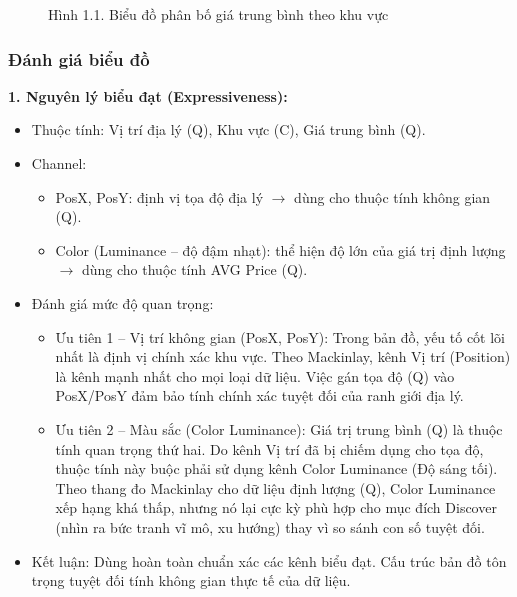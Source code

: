 \begin{figure}[H]
    \centering
    \caption{Hình 1.1. Biểu đồ phân bố giá trung bình theo khu vực}
    \label{fig:domain-task1-chart1}
\end{figure}

\subsubsection{Đánh giá biểu đồ}

\textbf{1. Nguyên lý biểu đạt (Expressiveness):}

\begin{itemize}
    \item Thuộc tính: Vị trí địa lý (Q), Khu vực (C), Giá trung bình (Q).
    \item Channel:
    \begin{itemize}
        \item PosX, PosY: định vị tọa độ địa lý $\rightarrow$ dùng cho thuộc tính không gian (Q).
        \item Color (Luminance -- độ đậm nhạt): thể hiện độ lớn của giá trị định lượng $\rightarrow$ dùng cho thuộc tính AVG Price (Q).
    \end{itemize}
    \item Đánh giá mức độ quan trọng:
    \begin{itemize}
        \item Ưu tiên 1 -- Vị trí không gian (PosX, PosY): Trong bản đồ, yếu tố cốt lõi nhất là định vị chính xác khu vực. Theo Mackinlay, kênh Vị trí (Position) là kênh mạnh nhất cho mọi loại dữ liệu. Việc gán tọa độ (Q) vào PosX/PosY đảm bảo tính chính xác tuyệt đối của ranh giới địa lý.
        \item Ưu tiên 2 -- Màu sắc (Color Luminance): Giá trị trung bình (Q) là thuộc tính quan trọng thứ hai. Do kênh Vị trí đã bị chiếm dụng cho tọa độ, thuộc tính này buộc phải sử dụng kênh Color Luminance (Độ sáng tối). Theo thang đo Mackinlay cho dữ liệu định lượng (Q), Color Luminance xếp hạng khá thấp, nhưng nó lại cực kỳ phù hợp cho mục đích Discover (nhìn ra bức tranh vĩ mô, xu hướng) thay vì so sánh con số tuyệt đối.
    \end{itemize}
    \item Kết luận: Dùng hoàn toàn chuẩn xác các kênh biểu đạt. Cấu trúc bản đồ tôn trọng tuyệt đối tính không gian thực tế của dữ liệu.
\end{itemize}


